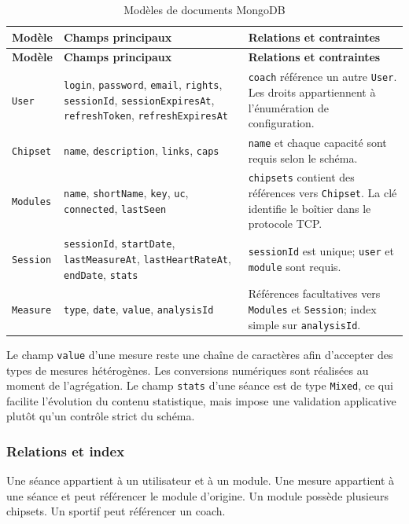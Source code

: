 \documentclass[11pt,a4paper]{article}
\newcommand{\code}[1]{\nolinkurl{#1}}
\begin{document}
\begin{longtable}{L{3.0cm}L{8.7cm}L{4.3cm}}
\caption{Modèles de documents MongoDB}\label{tab:modeles-mongo}\\
\toprule
\textbf{Modèle} & \textbf{Champs principaux} & \textbf{Relations et contraintes} \\
\midrule
\endfirsthead
\toprule
\textbf{Modèle} & \textbf{Champs principaux} & \textbf{Relations et contraintes} \\
\midrule
\endhead
\code{User} & \code{login}, \code{password}, \code{email}, \code{rights}, \code{sessionId}, \code{sessionExpiresAt}, \code{refreshToken}, \code{refreshExpiresAt} & \code{coach} référence un autre \code{User}. Les droits appartiennent à l'énumération de configuration. \\
\code{Chipset} & \code{name}, \code{description}, \code{links}, \code{caps} & \code{name} et chaque capacité sont requis selon le schéma. \\
\code{Modules} & \code{name}, \code{shortName}, \code{key}, \code{uc}, \code{connected}, \code{lastSeen} & \code{chipsets} contient des références vers \code{Chipset}. La clé identifie le boîtier dans le protocole TCP. \\
\code{Session} & \code{sessionId}, \code{startDate}, \code{lastMeasureAt}, \code{lastHeartRateAt}, \code{endDate}, \code{stats} & \code{sessionId} est unique; \code{user} et \code{module} sont requis. \\
\code{Measure} & \code{type}, \code{date}, \code{value}, \code{analysisId} & Références facultatives vers \code{Modules} et \code{Session}; index simple sur \code{analysisId}. \\
\bottomrule
\end{longtable}

Le champ \code{value} d'une mesure reste une chaîne de caractères afin d'accepter des types de mesures hétérogènes. Les conversions numériques sont réalisées au moment de l'agrégation. Le champ \code{stats} d'une séance est de type \code{Mixed}, ce qui facilite l'évolution du contenu statistique, mais impose une validation applicative plutôt qu'un contrôle strict du schéma.

\subsubsection{Relations et index}

Une séance appartient à un utilisateur et à un module. Une mesure appartient à une séance et peut référencer le module d'origine. Un module possède plusieurs chipsets. Un sportif peut référencer un coach.
\end{document}
